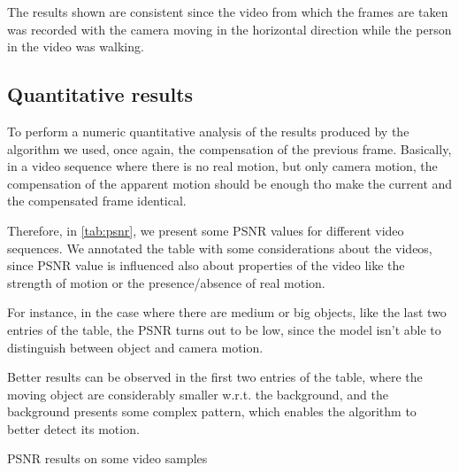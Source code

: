 The results shown are consistent since the video from which the frames are taken was recorded with the camera moving in the horizontal direction while the person in the video was walking.

\subsection{Quantitative results}

To perform a numeric quantitative analysis of the results produced by the algorithm we used, once again, the compensation of the previous frame. Basically, in a video sequence where there is no real motion, but only camera motion, the compensation of the apparent motion should be enough tho make the current and the compensated frame identical.

Therefore, in \cref{tab:psnr}, we present some PSNR values for different video sequences. We annotated the table with some considerations about the videos, since PSNR value is influenced also about properties of the video like the strength of motion or the presence/absence of real motion.

For instance, in the case where there are medium or big objects, like the last two entries of the table, the PSNR turns out to be low, since the model isn't able to distinguish between object and camera motion.

Better results can be observed in the first two entries of the table, where the moving object are considerably smaller w.r.t. the background, and the background presents some complex pattern, which enables the algorithm to better detect its motion.

\begin{table}
    \label{tab:psnr}
    
    \caption{PSNR results on some video samples}
\end{table}    

